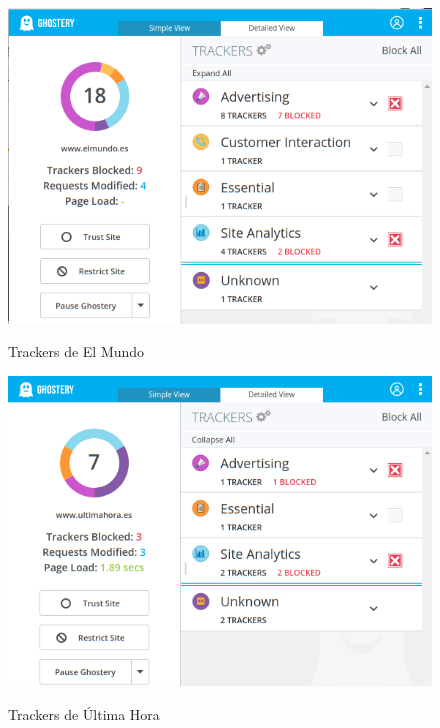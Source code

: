 \documentclass[10pt,a4paper]{article}
\begin{document}
\begin{figure}[H]
  \centering
  \includegraphics[scale=0.6]{ghost_elmundo.png}\\
  \caption{Trackers de El Mundo}
  \label{fig:object}
\end{figure}

\begin{figure}[H]
  \centering
  \includegraphics[scale=0.6]{ghost_ultima_hora.png}\\
  \caption{Trackers de Última Hora}
  \label{fig:object}
\end{figure}
\end{document}

